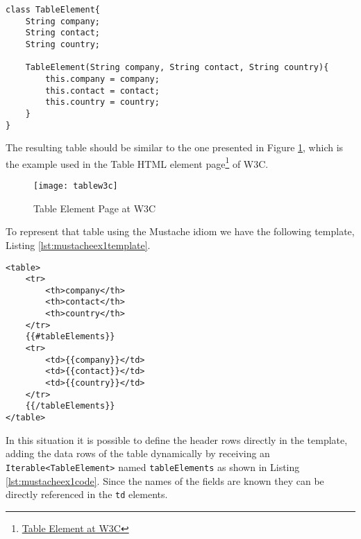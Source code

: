 \bigskip


\begin{minipage}{\linewidth}
\begin{lstlisting}[caption={Company Information Table Element}, label={lst:companyinfo}]
class TableElement{
    String company;
    String contact;
    String country;

    TableElement(String company, String contact, String country){
        this.company = company;
        this.contact = contact;
        this.country = country;
    }
}
\end{lstlisting}
\end{minipage} 

\noindent
The resulting table should be similar to the one presented in Figure \ref{img:tableelement}, which is the example used in the Table HTML element page\footnote{\href{https://www.w3schools.com/html/html_tables.asp}{Table Element at W3C}} of \ac{W3C}. 

\bigskip

\begin{figure}[H]
	\centering
	\texttt{[image: tablew3c]}
	\caption{Table Element Page at W3C}
	\label{img:tableelement}
\end{figure}

\noindent
To represent that table using the Mustache idiom we have the following template, Listing \ref{lst:mustacheex1template}.

\bigskip


\begin{minipage}{\linewidth}
\begin{lstlisting}[caption={Company Information Table Element}, label={lst:mustacheex1template}]
<table>
    <tr>
        <th>company</th>
        <th>contact</th>
        <th>country</th>
    </tr>
    {{#tableElements}}
    <tr>
        <td>{{company}}</td>
        <td>{{contact}}</td>
        <td>{{country}}</td>
    </tr>
    {{/tableElements}}
</table>
\end{lstlisting}
\end{minipage} 

\noindent
In this situation it is possible to define the header rows directly in the template, adding the data rows of the table dynamically by receiving an \texttt{Iterable<TableElement>} named \texttt{tableElements} as shown in Listing \ref{lst:mustacheex1code}. Since the names of the fields are known they can be directly referenced in the \texttt{td} elements.

